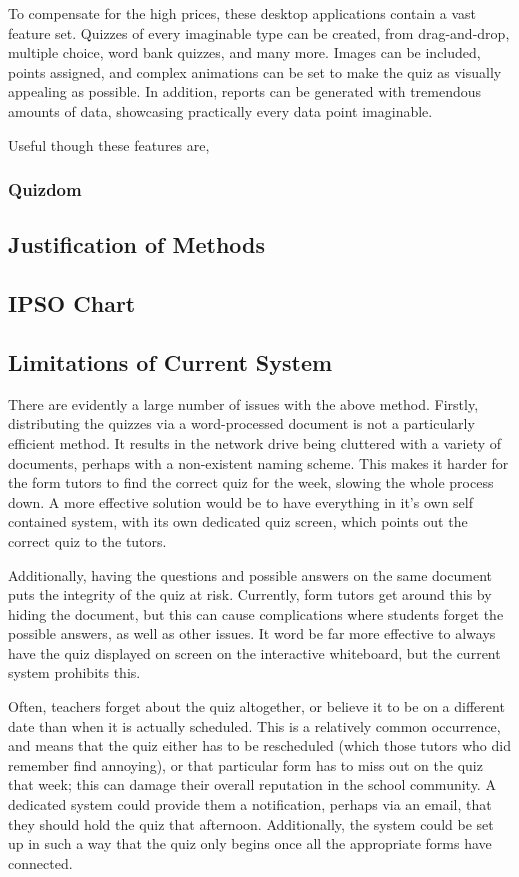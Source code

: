 To compensate for the high prices, these desktop applications contain a vast feature set. Quizzes of every imaginable type can be created, from drag-and-drop, multiple choice, word bank quizzes, and many more. Images can be included, points assigned, and complex animations can be set to make the quiz as visually appealing as possible. In addition, reports can be generated with tremendous amounts of data, showcasing practically every data point imaginable.

Useful though these features are, 

\subsubsection{Quizdom}


\subsection{Justification of Methods}

\subsection{IPSO Chart}

\subsection{Limitations of Current System}
There are evidently a large number of issues with the above method. Firstly, distributing the quizzes via a word-processed document is not a particularly efficient method. It results in the network drive being cluttered with a variety of documents, perhaps with a non-existent naming scheme. This makes it harder for the form tutors to find the correct quiz for the week, slowing the whole process down. A more effective solution would be to have everything in it's own self contained system, with its own dedicated quiz screen, which points out the correct quiz to the tutors.

Additionally, having the questions and possible answers on the same document puts the integrity of the quiz at risk. Currently, form tutors get around this by hiding the document, but this can cause complications where students forget the possible answers, as well as other issues. It word be far more effective to always have the quiz displayed on screen on the interactive whiteboard, but the current system prohibits this.

Often, teachers forget about the quiz altogether, or believe it to be on a different date than when it is actually scheduled. This is a relatively common occurrence, and means that the quiz either has to be rescheduled (which those tutors who did remember find annoying), or that particular form has to miss out on the quiz that week; this can damage their overall reputation in the school community. A dedicated system could provide them a notification, perhaps via an email, that they should hold the quiz that afternoon. Additionally, the system could be set up in such a way that the quiz only begins once all the appropriate forms have connected.

